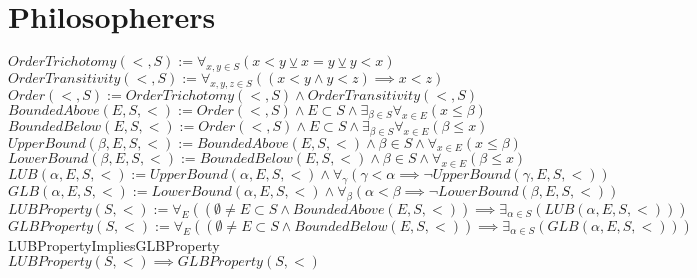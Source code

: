 \documentclass{book}
\newcommand{\df}[1]{#1}
\newcommand{\rf}[1]{#1}
\newcommand{\wff}[1]{#1}
\newcommand{\abr}{:=}
\newcommand{\pr}[1]{\left(#1\right)}
\newcommand{\setbackgroundcolour}{\pagecolor[rgb]{0.19,0.19,0.19}}
\newcommand{\settextcolour}{\color[rgb]{0.77,0.77,0.77}}
\newcommand{\invertbackgroundtext}{\setbackgroundcolour\settextcolour}
\begin{document}
\invertbackgroundtext 

\tableofcontents

\chapter{Philosopherers}
$\df{OrderTrichotomy}(<, S) \abr \forall_{x, y \in S}(x < y \veebar x = y \veebar y < x)$ \\
$\df{OrderTransitivity}(<, S) \abr \forall_{x, y, z \in S}\pr{(x < y \land y < z) \implies x < z}$ \\
$\df{Order}(<, S) \abr \rf{OrderTrichotomy}(<, S) \land \rf{OrderTransitivity}(<, S)$ \\
$\df{BoundedAbove}(E, S, <) \abr \rf{Order}(<, S) \land E \subset S \land \exists_{\beta \in S} \forall_{x \in E}(x \leq \beta)$ \\
$\df{BoundedBelow}(E, S, <) \abr \rf{Order}(<, S) \land E \subset S \land \exists_{\beta \in S} \forall_{x \in E}(\beta \leq x)$ \\
$\df{UpperBound}(\beta, E, S, <) \abr \rf{BoundedAbove}(E, S, <) \land \beta \in S \land \forall_{x \in E}(x \leq \beta)$ \\
$\df{LowerBound}(\beta, E, S, <) \abr \rf{BoundedBelow}(E, S, <) \land \beta \in S \land \forall_{x \in E}(\beta \leq x)$ \\
$\df{LUB}(\alpha, E, S, <) \abr \rf{UpperBound}(\alpha, E, S, <) \land \forall_{\gamma}\pr{\gamma < \alpha \implies \lnot \rf{UpperBound}(\gamma, E, S, <)}$ \\
$\df{GLB}(\alpha, E, S, <) \abr \rf{LowerBound}(\alpha, E, S, <) \land \forall_{\beta}\pr{\alpha < \beta \implies \lnot \rf{LowerBound}(\beta, E, S, <)}$ \\
$\df{LUBProperty}(S, <) \abr \forall_{E}\pr{\pr{\emptyset \neq E \subset S \land \rf{BoundedAbove}(E, S, <)} \implies \exists_{\alpha \in S}\pr{\rf{LUB}(\alpha, E, S, <)}}$ \\
$\df{GLBProperty}(S, <) \abr \forall_{E}\pr{\pr{\emptyset \neq E \subset S \land \rf{BoundedBelow}(E, S, <)} \implies \exists_{\alpha \in S}\pr{\rf{GLB}(\alpha, E, S, <)}}$ \\
\wff{LUBPropertyImpliesGLBProperty} $\rf{LUBProperty}(S, <) \implies \rf{GLBProperty}(S, <)$ \\
\end{document}
